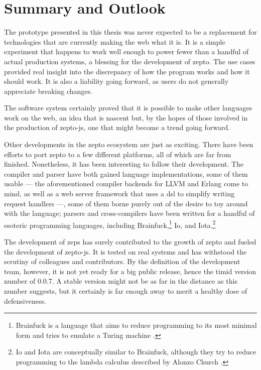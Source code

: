 \documentclass[oneside,11pt,xetex]{scrbook}
\begin{document}
\chapter{Summary and Outlook}
\label{chap:outlook}

The prototype presented in this thesis was never expected to be a replacement
for technologies that are currently making the web what it is. It is a simple
experiment that happens to work well enough to power fewer than a handful of
actual production systems, a blessing for the development of zepto. The
use cases provided real insight into the discrepancy of how the program
works and how it should work. It is also a liability going forward, as users
do not generally appreciate breaking changes.

The software system certainly proved that it is possible to make other
languages work on the web, an idea that is nascent but, by the hopes of
those involved in the production of zepto-js, one that might become a trend
going forward.

Other developments in the zepto ecosystem are just as exciting. There have
been efforts to port zepto to a few different platforms, all of which are
far from finished. Nonetheless, it has been interesting to follow their development.
The compiler and parser have both gained language implementations, some of
them usable --- the aforementioned compiler backends for LLVM and Erlang come to
mind, as well as a web server framework that uses a \gls{dsl} to simplify writing
request handlers ---, some of them borne purely out of the desire to toy around
with the language; parsers and cross-compilers have been written for a handful of
esoteric programming languages, including Brainfuck,\footnote{Brainfuck is a language
that aims to reduce programming to its most minimal form and tries to emulate a Turing
machine \parencite{BFK}.} Io, and Iota.\footnote{Io and Iota are conceptually similar
to Brainfuck, although they try to reduce programming to the lambda calculus described
by Alonzo Church \parencite{IOT}.}

The development of \gls{zeps} has surely contributed to the growth of zepto and
fueled the development of zepto-js. It is tested on real systems and has
withstood the scrutiny of colleagues and contributors. By the definition of the
development team, however, it is not yet ready for a big public release, hence
the timid version number of 0.0.7. A stable version might not be as far in the
distance as this number suggests, but it certainly is far enough away to merit
a healthy dose of defensiveness.
\end{document}
